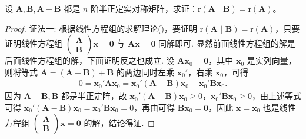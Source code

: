 \documentclass[../../main.tex]{subfiles}
\begin{document}
\begin{proposition}\label{proposition:例8.76}
设 $\boldsymbol{A},\boldsymbol{B},\boldsymbol{A}-\boldsymbol{B}$ 都是 $n$ 阶半正定实对称矩阵，求证：$\mathrm{r}\left( \boldsymbol{A}\,\,|\,\,\boldsymbol{B} \right) =\mathrm{r}(\boldsymbol{A})$。
\end{proposition}
\begin{proof}
{\color{blue}证法一:}
根据线性方程组的求解理论()，要证明 $\mathrm{r}\left( \boldsymbol{A}\,\,|\,\,\boldsymbol{B} \right) =\mathrm{r}(\boldsymbol{A})$，只要证明线性方程组 $\begin{pmatrix}
\boldsymbol{A} \\
\boldsymbol{B}
\end{pmatrix}\boldsymbol{x}=\boldsymbol{0}$ 与 $\boldsymbol{A}\boldsymbol{x}=\boldsymbol{0}$ 同解即可. 显然前面线性方程组的解是后面线性方程组的解，下面证明反之也成立. 设 $\boldsymbol{A}\boldsymbol{x}_0=\boldsymbol{0}$，其中 $\boldsymbol{x}_0$ 是实列向量，则将等式 $\boldsymbol{A}=(\boldsymbol{A}-\boldsymbol{B})+\boldsymbol{B}$ 的两边同时左乘 $\boldsymbol{x}_0'$，右乘 $\boldsymbol{x}_0$，可得
\begin{align*}
0=\boldsymbol{x}_0'\boldsymbol{A}\boldsymbol{x}_0=\boldsymbol{x}_0'(\boldsymbol{A}-\boldsymbol{B})\boldsymbol{x}_0+\boldsymbol{x}_0'\boldsymbol{B}\boldsymbol{x}_0.
\end{align*}
因为 $\boldsymbol{A}-\boldsymbol{B},\boldsymbol{B}$ 都是半正定阵，故 $\boldsymbol{x}_0'(\boldsymbol{A}-\boldsymbol{B})\boldsymbol{x}_0\geqslant 0$，$\boldsymbol{x}_0'\boldsymbol{B}\boldsymbol{x}_0\geqslant 0$，由上述等式可得 $\boldsymbol{x}_0'(\boldsymbol{A}-\boldsymbol{B})\boldsymbol{x}_0=\boldsymbol{x}_0'\boldsymbol{B}\boldsymbol{x}_0 = 0$，再由可得 $\boldsymbol{B}\boldsymbol{x}_0=\boldsymbol{0}$，因此 $\boldsymbol{x}=\boldsymbol{x}_0$ 也是线性方程组 $\begin{pmatrix}
\boldsymbol{A} \\
\boldsymbol{B}
\end{pmatrix}\boldsymbol{x}=\boldsymbol{0}$ 的解，结论得证.


\end{proof}
\end{document}
